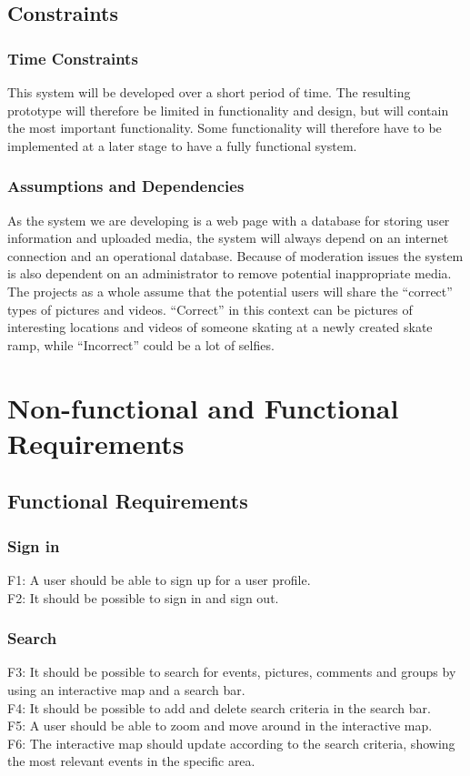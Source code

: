 \subsection{Constraints}
\label{subsec:SysReqIntroConstr}

\subsubsection*{Time Constraints} 
This system will be developed over a short period of time. The resulting prototype will therefore be limited in functionality and design, but will contain the most important functionality. Some functionality will therefore have to be implemented at a later stage to have a fully functional system.
\subsubsection*{Assumptions and Dependencies} As the system we are developing is a web page with a database for storing user information and uploaded media, the system will always depend on an internet connection and an operational database. Because of moderation issues the system is also dependent on an administrator to remove potential inappropriate  media. The projects as a whole assume that the potential users will share the “correct” types of pictures and videos. “Correct” in this context can be pictures of interesting locations and videos of someone skating at a newly created skate ramp, while  “Incorrect” could be a lot of selfies.

\section{Non-functional and Functional Requirements}
\label{sec:SysReqReqs}

\subsection{Functional Requirements}
\label{subsec:SysReqReqsFunc}

\subsubsection{Sign in}
F1: A user should be able to sign up for a user profile. \\
F2: It should be possible to sign in and sign out.

\subsubsection{Search}
F3: It should be possible to search for events, pictures, comments and groups by using an interactive map and a search bar. \\
F4: It should be possible to add and delete search criteria in the search bar. \\
F5: A user should be able to zoom and move around in the interactive map. \\
F6: The interactive map should update according to the search criteria, showing the most relevant events in the specific area.

